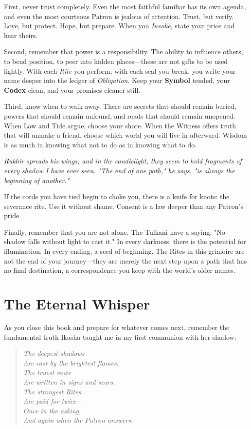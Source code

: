 \documentclass[12pt,twoside]{book}
\newcommand{\shadow}[1]{\textit{#1}}
\begin{document}
First, never trust completely. Even the most faithful familiar has its own agenda, and even the most courteous Patron is jealous of attention. Trust, but verify. Love, but protect. Hope, but prepare. When you \emph{Invoke}, state your price and hear theirs.

Second, remember that power is a responsibility. The ability to influence others, to bend position, to peer into hidden places—these are not gifts to be used lightly. With each \emph{Rite} you perform, with each seal you break, you write your name deeper into the ledger of \emph{Obligation}. Keep your \textbf{Symbol} tended, your \textbf{Codex} clean, and your promises cleaner still.

Third, know when to walk away. There are secrets that should remain buried, powers that should remain unfound, and roads that should remain unopened. When Law and Tide argue, choose your shore. When the Witness offers truth that will unmake a friend, choose which world you will live in afterward. Wisdom is as much in knowing what not to do as in knowing what to do.

\shadow{Rukhir spreads his wings, and in the candlelight, they seem to hold fragments of every shadow I have ever seen. "The end of one path," he says, "is always the beginning of another."}

If the cords you have tied begin to choke you, there is a knife for knots: the severance rite. Use it without shame. Consent is a law deeper than any Patron’s pride.

Finally, remember that you are not alone. The Tulkani have a saying: "No shadow falls without light to cast it." In every darkness, there is the potential for illumination. In every ending, a seed of beginning. The Rites in this grimoire are not the end of your journey—they are merely the next step upon a path that has no final destination, a correspondence you keep with the world’s older names.

\section*{The Eternal Whisper}

As you close this book and prepare for whatever comes next, remember the fundamental truth Ikasha taught me in my first communion with her shadow:

\begin{verse}
\textit{The deepest shadows} \\
\textit{Are cast by the brightest flames.} \\
\textit{The truest vows} \\
\textit{Are written in signs and scars.} \\
\textit{The strongest Rites} \\
\textit{Are paid for twice—} \\
\textit{Once in the asking,} \\
\textit{And again when the Patron answers.}
\end{verse}
\end{document}
